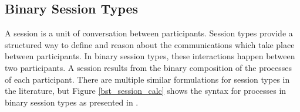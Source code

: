 \documentclass[12pt,twoside]{report}
\newcommand{\comment}[1]{}
\begin{document}

\subsection{Binary Session Types}
A session is a unit of conversation between participants. Session types provide a structured way to define and reason about the communications which take place between participants. In binary session types, these interactions happen between two participants. A session results from the binary composition of the processes of each participant. There are multiple similar formulations for session types in the literature, but Figure \ref{bst_session_calc} shows the syntax for processes in binary session types as presented in \cite{co406}. %
\end{document}

